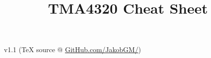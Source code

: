 \documentclass[6pt]{article}
\date{}
\title{TMA4320 Cheat Sheet}
\theoremstyle{definition}
\begin{document}
\begin{multicols*}{3}

\maketitle
v1.1 (TeX source @ \href{https://github.com/JakobGM/Numerical-Analysis-Cheat-Sheet}{GitHub.com/JakobGM/})






\end{multicols*}
\end{document}
